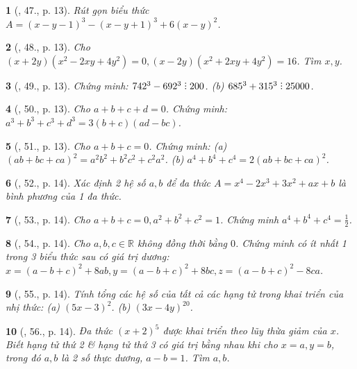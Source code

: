 \documentclass{article}
\newtheorem{baitoan}{}
\DeclareRobustCommand{\divby}{%
	\mathrel{\vbox{\baselineskip.65ex\lineskiplimit0pt\hbox{.}\hbox{.}\hbox{.}}}%
}
\begin{document}
\begin{baitoan}[\cite{Tuyen_Toan_8}, 47., p. 13]
	Rút gọn biểu thức $A = (x - y - 1)^3 - (x - y + 1)^3 + 6(x - y)^2$.
\end{baitoan}

\begin{baitoan}[\cite{Tuyen_Toan_8}, 48., p. 13]
	Cho $(x + 2y)(x^2 - 2xy + 4y^2) = 0,(x - 2y)(x^2 + 2xy + 4y^2) = 16$. Tìm $x,y$.
\end{baitoan}

\begin{baitoan}[\cite{Tuyen_Toan_8}, 49., p. 13]
	Chứng minh: $742^3 - 692^3\divby200$. (b) $685^3 + 315^3\divby25000$.
\end{baitoan}

\begin{baitoan}[\cite{Tuyen_Toan_8}, 50., p. 13]
	Cho $a + b + c + d = 0$. Chứng minh: $a^3 + b^3 + c^3 + d^3 = 3(b + c)(ad - bc)$.
\end{baitoan}

\begin{baitoan}[\cite{Tuyen_Toan_8}, 51., p. 13]
	Cho $a + b + c = 0$. Chứng minh: (a) $(ab + bc + ca)^2 = a^2b^2 + b^2c^2 + c^2a^2$. (b) $a^4 + b^4 + c^4 = 2(ab + bc + ca)^2$.
\end{baitoan}

\begin{baitoan}[\cite{Tuyen_Toan_8}, 52., p. 14]
	Xác định 2 hệ số $a,b$ để đa thức $A = x^4 - 2x^3 + 3x^2 + ax + b$ là bình phương của 1 đa thức.
\end{baitoan}

\begin{baitoan}[\cite{Tuyen_Toan_8}, 53., p. 14]
	Cho $a + b + c = 0,a^2 + b^2 + c^2 = 1$. Chứng minh $a^4 + b^4 + c^4 = \frac{1}{2}$.
\end{baitoan}

\begin{baitoan}[\cite{Tuyen_Toan_8}, 54., p. 14]
	Cho $a,b,c\in\mathbb{R}$ không đồng thời bằng $0$. Chứng minh có ít nhất 1 trong 3 biểu thức sau có giá trị dương: $x = (a - b + c)^2 + 8ab,y = (a - b + c)^2 + 8bc,z = (a - b + c)^2 - 8ca$.
\end{baitoan}

\begin{baitoan}[\cite{Tuyen_Toan_8}, 55., p. 14]
	Tính tổng các hệ số của tất cả các hạng tử trong khai triển của nhị thức: (a) $(5x - 3)^2$. (b) $(3x - 4y)^{20}$.
\end{baitoan}

\begin{baitoan}[\cite{Tuyen_Toan_8}, 56., p. 14]
	Đa thức $(x + 2)^5$ được khai triển theo lũy thừa giảm của $x$. Biết hạng tử thứ 2 \& hạng tử thứ 3 có giá trị bằng nhau khi cho $x = a,y = b$, trong đó $a,b$ là 2 số thực dương, $a - b = 1$. Tìm $a,b$.
\end{baitoan}
\end{document}
